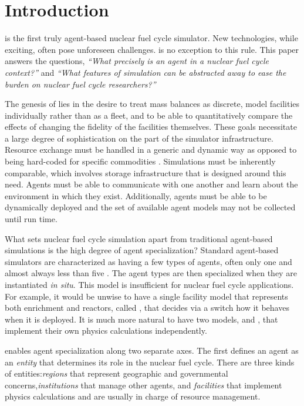 \section{Introduction}
\label{sec-intro}

\Cyclus \cite{cyclus_v1_0,cyclus_v1_2,huff_fundamental_2016} is the first truly agent-based
\cite{jennings2000agent} nuclear fuel cycle simulator.
New technologies, while exciting, often pose unforeseen challenges.
\Cyclus is no exception to this rule.  This paper answers the questions,
\emph{``What precisely is an agent in a nuclear fuel cycle context?''} and
\emph{``What features of simulation can be abstracted away to ease the burden
on nuclear fuel cycle researchers?''}

The genesis of \cyclus lies in the desire to
treat mass balances as discrete, model facilities individually rather than as
a fleet, and to be able to quantitatively compare the effects of changing the
fidelity of the facilities themselves. These goals necessitate a large degree of
sophistication on the part of the simulator infrastructure.  Resource exchange
must be handled in a generic and dynamic way as opposed to being hard-coded
for specific commodities \cite{Gidden2016}. Simulations must be inherently comparable, which involves
storage infrastructure that is designed around this need. Agents must be able
to communicate with one another and learn about the environment in which they
exist. Additionally, agents must be able to be dynamically deployed and the set of
available agent models may not be collected until run time.

What sets nuclear fuel cycle simulation apart from traditional agent-based simulations
is the high degree of agent specialization? Standard agent-based simulators
are characterized as having a few types of agents, often only one and
almost always less than five \cite{taylor2014agent}. The agent types are then
specialized
when they are instantiated \emph{in situ}. This model is insufficient for
nuclear fuel cycle applications.  For example, it would be unwise to have a single facility model
that represents both enrichment and reactors, called ,
that decides via a switch how it behaves when it is deployed. It is much
more natural to have two models,  and ,
that implement their own physics calculations independently.

\Cyclus enables agent specialization along two separate axes. The first defines
an agent as an \emph{entity} that determines its role in the
nuclear fuel cycle. There are three kinds of entities:\emph{regions} that
represent geographic and governmental concerns,\emph{institutions}
that manage other agents, and \emph{facilities} that implement
physics calculations and are usually in charge of resource management.

